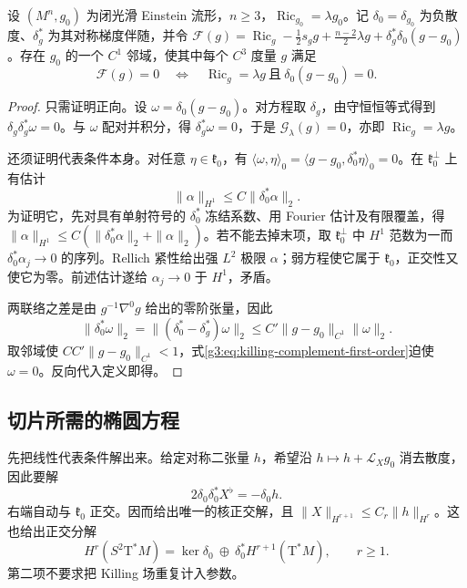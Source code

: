 \begin{theorem}\label{g3:thm:einstein-gauge-equivalence}
	设 \((M^n,g_0)\) 为闭光滑 Einstein 流形，\(n\ge3\)，\(\operatorname{Ric}_{g_0}=\lambda g_0\)。记 \(\delta_0=\delta_{g_0}\) 为负散度、\(\delta_g^*\) 为其对称梯度伴随，并令 \(\mathcal F(g)=\operatorname{Ric}_g-\tfrac12s_gg+\tfrac{n-2}2\lambda g+\delta_g^*\delta_0(g-g_0)\)。存在 \(g_0\) 的一个 \(C^1\) 邻域，使其中每个 \(C^3\) 度量 \(g\) 满足
	\[
		\mathcal F(g)=0
		\quad\Longleftrightarrow\quad
		\operatorname{Ric}_g=\lambda g\ \text{且}\ \delta_0(g-g_0)=0.
	\]
\end{theorem}
\begin{proof}
	只需证明正向。设 \(\omega=\delta_0(g-g_0)\)。对方程取 \(\delta_g\)，由守恒恒等式得到 \(\delta_g\delta_g^*\omega=0\)。与 \(\omega\) 配对并积分，得 \(\delta_g^*\omega=0\)，于是 \(\mathcal G_\lambda(g)=0\)，亦即 \(\operatorname{Ric}_g=\lambda g\)。

	还须证明代表条件本身。对任意 \(\eta\in\mathfrak k_0\)，有
	\(\langle\omega,\eta\rangle_0=\langle g-g_0,\delta_0^*\eta\rangle_0=0\)。在 \(\mathfrak k_0^\perp\) 上有估计
	\begin{equation}\label{g3:eq:killing-complement-first-order}
		\|\alpha\|_{H^1}\le C\|\delta_0^*\alpha\|_2.
	\end{equation}
	为证明它，先对具有单射符号的 \(\delta_0^*\) 冻结系数、用 Fourier 估计及有限覆盖，得 \(\|\alpha\|_{H^1}\le C(\|\delta_0^*\alpha\|_2+\|\alpha\|_2)\)。若不能去掉末项，取 \(\mathfrak k_0^\perp\) 中 \(H^1\) 范数为一而 \(\delta_0^*\alpha_j\to0\) 的序列。Rellich 紧性给出强 \(L^2\) 极限 \(\alpha\)；弱方程使它属于 \(\mathfrak k_0\)，正交性又使它为零。前述估计遂给 \(\alpha_j\to0\) 于 \(H^1\)，矛盾。

	两联络之差是由 \(g^{-1}\nabla^0g\) 给出的零阶张量，因此
	\[
		\|\delta_0^*\omega\|_2
		=\|(\delta_0^*-\delta_g^*)\omega\|_2
		\le C'\|g-g_0\|_{C^1}\|\omega\|_2.
	\]
	取邻域使 \(CC'\|g-g_0\|_{C^1}<1\)，式\eqref{g3:eq:killing-complement-first-order}迫使 \(\omega=0\)。反向代入定义即得。
\end{proof}

\subsection{切片所需的椭圆方程}
\label{g3:subsec:2502:03}
先把线性代表条件解出来。给定对称二张量 \(h\)，希望沿 \(h\mapsto h+\mathcal L_Xg_0\) 消去散度，因此要解
\begin{equation}\label{g3:eq:metric-linear-slice-equation}
	2\delta_0\delta_0^*X^\flat=-\delta_0h.
\end{equation}
右端自动与 \(\mathfrak k_0\) 正交。因而给出唯一的核正交解，且 \(\|X\|_{H^{r+1}}\le C_r\|h\|_{H^r}\)。这也给出正交分解
\[
	H^r(S^2\mathrm T^*M)
	=\ker\delta_0\ \oplus\ \delta_0^*H^{r+1}(\mathrm T^*M),\qquad r\ge1.
\]
第二项不要求把 Killing 场重复计入参数。


